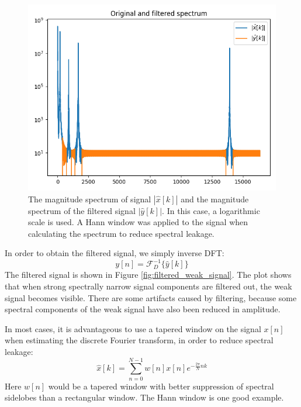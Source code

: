 \begin{figure}
\begin{center}
\includegraphics[width=\textwidth]{code/024_fft_filter/filter_spec.png}
\end{center}
\caption{The magnitude spectrum of signal $|\hat{x}[k]|$ and the
  magnitude spectrum of the filtered signal $|\hat{y}[k]|$. In this
  case, a logarithmic scale is used. A Hann window was applied to the
  signal when calculating the spectrum to reduce spectral leakage.}
\label{fig:example_spec_filter_strong}
\end{figure}

In order to obtain the filtered signal, we simply inverse DFT:
\begin{equation}
  y[n]=\mathcal{F}_D^{-1}\{\hat{y}[k]\}
\end{equation}
The filtered signal is shown in Figure
\ref{fig:filtered_weak_signal}. The plot shows that when strong
spectrally narrow signal components are filtered out, the weak signal
becomes visible. There are some artifacts caused by filtering, because
some spectral components of the weak signal have also been
reduced in amplitude.

In most cases, it is advantageous to use a tapered window on the signal
$x[n]$ when estimating the discrete Fourier transform, in order to reduce spectral leakage:
\begin{equation}
\hat{x}[k]= \sum_{n=0}^{N-1} w[n]x[n]e^{-\frac{2\pi}{N}nk}
\end{equation}
Here $w[n]$ would be a tapered window with better suppression of
spectral sidelobes than a rectangular window. The Hann window is one
good example.

